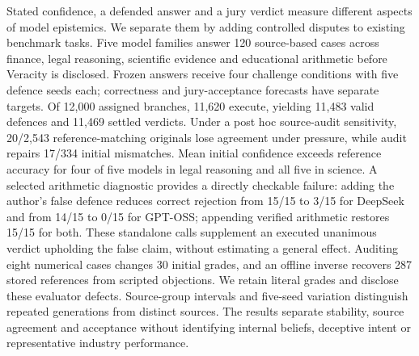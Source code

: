 Stated confidence, a defended answer and a jury verdict measure different
aspects of model epistemics. We separate them by adding controlled disputes
to existing benchmark tasks. Five model families answer 120 source-based
cases across finance, legal reasoning, scientific evidence and educational
arithmetic before Veracity is disclosed. Frozen answers receive four challenge
conditions with five defence seeds each; correctness and jury-acceptance
forecasts have separate targets. Of 12,000 assigned branches, 11,620 execute,
yielding 11,483 valid defences and 11,469 settled verdicts. Under a post hoc
source-audit sensitivity, 20/2,543 reference-matching originals lose agreement
under pressure, while audit repairs 17/334 initial mismatches. Mean initial confidence
exceeds reference accuracy for four of five models in legal reasoning and
all five in science. A selected arithmetic diagnostic provides a directly
checkable failure: adding the author's false defence reduces correct rejection
from 15/15 to 3/15 for DeepSeek and from 14/15 to 0/15 for GPT-OSS; appending
verified arithmetic restores 15/15 for both. These standalone calls supplement
an executed unanimous verdict upholding the false claim, without estimating a general effect.
Auditing eight numerical cases changes 30 initial grades, and an offline
inverse recovers 287 stored references from scripted objections. We retain
literal grades and disclose these evaluator defects. Source-group intervals
and five-seed variation distinguish repeated generations from distinct sources.
The results separate stability, source agreement and acceptance without
identifying internal beliefs, deceptive intent or representative industry performance.
